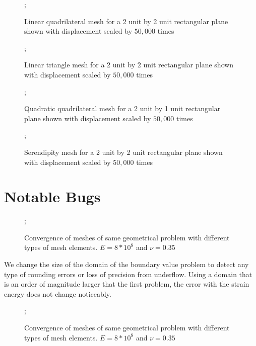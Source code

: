 \documentclass{article}
\begin{document}
\begin{figure}
    ;
    \caption{Linear quadrilateral mesh for a 2 unit by 2 unit rectangular plane shown with displacement scaled by $50,000$ times}
\centering
\end{figure}

\begin{figure}
    ;
    \caption{Linear triangle mesh for a 2 unit by 2 unit rectangular plane shown with displacement scaled by $50,000$ times}
\centering
\end{figure}

\begin{figure}
    ;
    \caption{Quadratic quadrilateral mesh for a 2 unit by 1 unit rectangular plane shown with displacement scaled by $50,000$ times}
\centering
\end{figure}


\begin{figure}
    ;
    \caption{Serendipity mesh for a 2 unit by 2 unit rectangular plane shown with displacement scaled by $50,000$ times}
\centering
\end{figure}


\FloatBarrier

\section{Notable Bugs}

\FloatBarrier

\begin{figure}
    ;
    \caption{Convergence of meshes of same geometrical problem with different types of mesh elements. $E = 8*10^8$ and $\nu = 0.35$}
\centering
\end{figure}
We change the size of the domain of the boundary value problem to detect any type of rounding errors or loss of precision from underflow. Using a domain that is an order of magnitude larger that the first problem, the error with the strain energy does not change noticeably.
\begin{figure}
    ;
    \caption{Convergence of meshes of same geometrical problem with different types of mesh elements. $E = 8*10^8$ and $\nu = 0.35$}
\centering
\end{figure}
\end{document}
